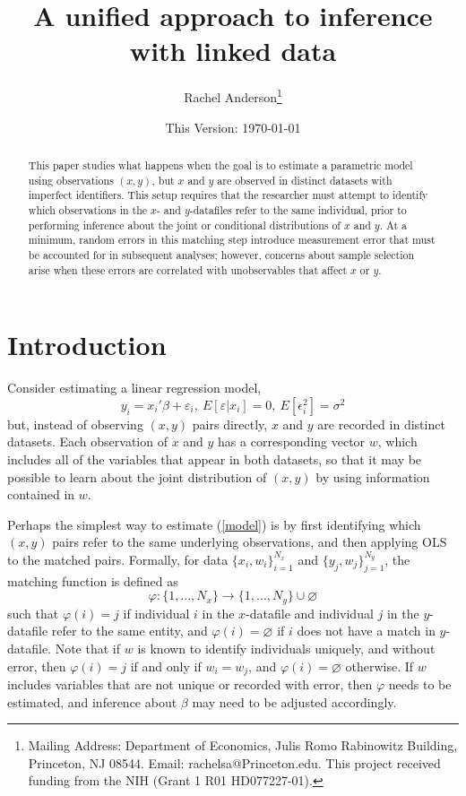 \documentclass[12pt]{article}
\title{\singlespacing A unified approach to inference with linked data}
\author{Rachel Anderson\thanks{Mailing Address: Department of Economics, Julis Romo Rabinowitz Building,
Princeton, NJ 08544. Email: rachelsa@Princeton.edu.
This project received funding from the NIH (Grant 1 R01 HD077227-01). }}
\date{This Version: \today}
\begin{document}
\maketitle


\begin{abstract}
\singlespacing
\noindent This paper studies what happens when the goal is to estimate a parametric model using observations $(x,y)$, but $x$ and $y$ are observed in distinct datasets with imperfect identifiers.  This setup requires that the researcher must attempt to identify which observations in the $x$- and $y$-datafiles refer to the same individual, prior to performing inference about the joint or conditional distributions of $x$ and $y$.  At a minimum, random errors in this matching step introduce measurement error that must be accounted for in subsequent analyses; however, concerns about sample selection arise when these errors are correlated with unobservables that affect $x$ or $y$.  \end{abstract}


\section{Introduction}

Consider estimating a linear regression model, \begin{equation} y_i = x_i'\beta + \varepsilon_i, \ E[\varepsilon | x_i] = 0, \ E[\epsilon_i^2] = \sigma^2  \label{model} \end{equation}
but, instead of observing $(x, y)$ pairs directly,  $x$ and $y$ are recorded in distinct datasets.  Each observation of $x$ and $y$ has a corresponding vector $w$, which includes all of the variables that appear in both datasets, so that it may be possible to learn about the joint distribution of $(x,y)$ by using information contained in $w$. 

Perhaps the simplest way to estimate (\ref{model}) is by first identifying which $(x,y)$ pairs refer to the same underlying observations, and then applying OLS to the matched pairs.   Formally, for data $\{x_i, w_i\}_{i=1}^{N_x}$ and $\{y_j, w_j\}_{j=1}^{N_y}$, the matching function is defined as \begin{equation} \varphi: \{1,\dots, N_x\} \to \{1,\dots, N_y\} \cup \varnothing \end{equation} such that $\varphi(i) = j$ if individual $i$ in the $x$-datafile and individual $j$ in the $y$-datafile refer to the same entity, and $\varphi(i) = \varnothing$ if $i$ does not have a match in $y$-datafile.  Note that if $w$ is known to identify individuals uniquely, and without error, then $\varphi(i) = j$ if and only if $w_i = w_j$, and $\varphi(i) = \varnothing$ otherwise.  If $w$ includes variables that are not unique or recorded with error, then $\varphi$ needs to be estimated, and inference about $\beta$ may need to be adjusted accordingly.   
\end{document}
